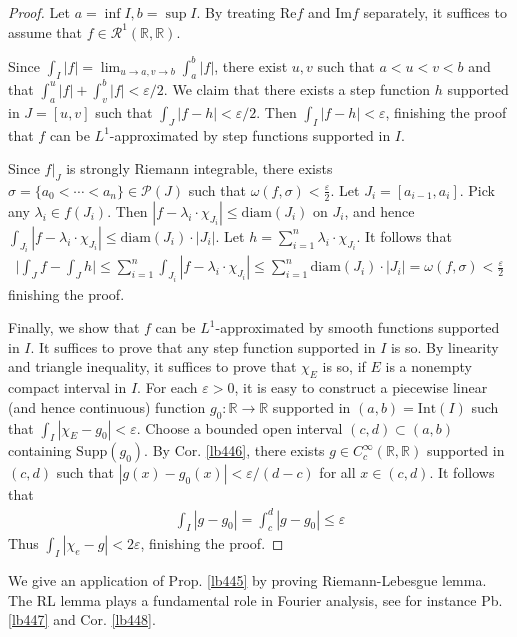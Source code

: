 \documentclass[12pt,b5paper,notitlepage]{article}
\theoremstyle{definition}
\theoremstyle{plain}
\newcommand{\mc}{\mathcal}
\newcommand{\scr}{\mathscr}
\newcommand{\Rbb}{\mathbb R}
\newcommand{\Real}{\mathrm{Re}}
\newcommand{\Imag}{\mathrm{Im}}
\newcommand{\Supp}{\mathrm{Supp}}
\newcommand{\Int}{\mathrm{Int}}
\newcommand{\diam}{\mathrm{diam}}
\newcommand{\eps}{\varepsilon}
\numberwithin{equation}{section}
\begin{document}
\begin{proof}
Let $a=\inf I,b=\sup I$. By treating $\Real f$ and $\Imag f$ separately, it suffices to assume that $f\in\scr R^1(\Rbb,\Rbb)$. 

Since $\int_I|f|=\lim_{u\rightarrow a,v\rightarrow b} \int_a^b|f|$, there exist $u,v$ such that $a<u<v<b$ and that $\int_a^u|f|+\int_v^b|f|<\eps/2$. We claim that there exists a step function $h$ supported in $J=[u,v]$ such that $\int_J |f-h|<\eps/2$. Then $\int_I|f-h|<\eps$, finishing the proof that $f$ can be $L^1$-approximated by step functions supported in $I$.

Since $f|_J$ is strongly Riemann integrable, there exists $\sigma=\{a_0<\cdots<a_n\}\in\mc P(J)$ such that $\omega(f,\sigma)<\frac\eps 2$. Let $J_i=[a_{i-1},a_i]$. Pick any $\lambda_i\in f(J_i)$. Then $|f-\lambda_i\cdot\chi_{J_i}|\leq\diam(J_i)$ on $J_i$, and hence $\int_{J_i}|f-\lambda_i\cdot\chi_{J_i}|\leq \diam(J_i)\cdot|J_i|$. Let $h=\sum_{i=1}^n\lambda_i\cdot\chi_{J_i}$. It follows that
\begin{align*}
\Big|\int_J f-\int_Jh  \Big|\leq\sum_{i=1}^n\int_{J_i}|f-\lambda_i\cdot\chi_{J_i}|\leq\sum_{i=1}^n\diam(J_i)\cdot|J_i|=\omega(f,\sigma)<\frac\eps 2
\end{align*}
finishing the proof.

Finally, we show that $f$ can be $L^1$-approximated by smooth functions supported in $I$. It suffices to prove that any step function supported in $I$ is so. By linearity and triangle inequality, it suffices to prove that $\chi_E$ is so, if $E$ is a nonempty compact interval in $I$. For each $\eps>0$, it is easy to construct a piecewise linear (and hence continuous) function $g_0:\Rbb\rightarrow\Rbb$ supported in $(a,b)=\Int(I)$ such that $\int_I|\chi_E-g_0|<\eps$. Choose a bounded open interval $(c,d)\subset (a,b)$ containing $\Supp(g_0)$. By Cor. \ref{lb446}, there exists $g\in C_c^\infty(\Rbb,\Rbb)$ supported in $(c,d)$ such that $|g(x)-g_0(x)|<\eps/(d-c)$ for all $x\in(c,d)$. It follows that
\begin{align*}
\int_I|g-g_0|=\int_c^d |g-g_0|\leq\eps
\end{align*}
Thus $\int_I|\chi_e-g|<2\eps$, finishing the proof.
\end{proof}




We give an application of Prop. \ref{lb445} by proving Riemann-Lebesgue lemma. The RL lemma plays a fundamental role in Fourier analysis, see for instance Pb. \ref{lb447} and Cor. \ref{lb448}. 
\end{document}
